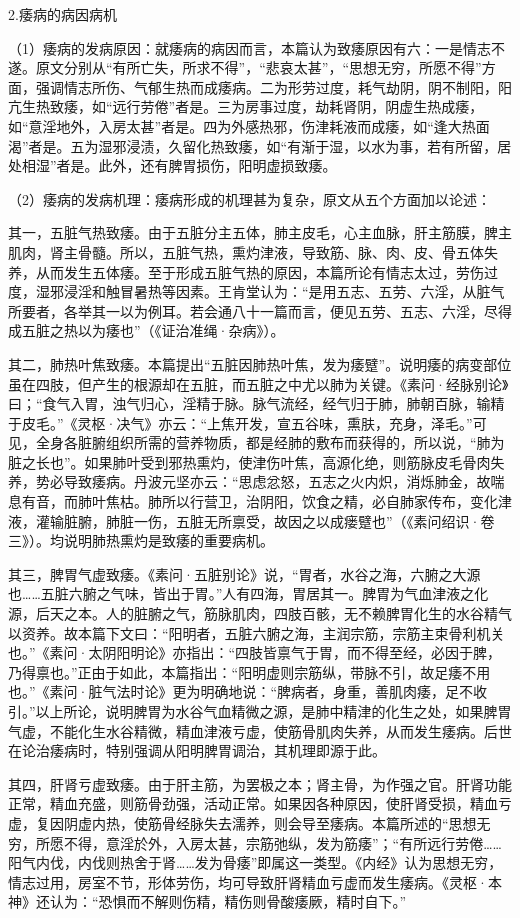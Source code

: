 \documentclass[draft,12pt]{ctexbook}
\begin{document}
2.痿病的病因病机

（1）痿病的发病原因：就痿病的病因而言，本篇认为致痿原因有六：一是情志不遂。原文分别从“有所亡失，所求不得”，“悲哀太甚”，“思想无穷，所愿不得”方面，强调情志所伤、气郁生热而成痿病。二为形劳过度，耗气劫阴，阴不制阳，阳亢生热致痿，如“远行劳倦”者是。三为房事过度，劫耗肾阴，阴虚生热成痿，如“意淫地外，入房太甚”者是。四为外感热邪，伤津耗液而成痿，如“逢大热面渴”者是。五为湿邪浸渍，久留化热致痿，如“有渐于湿，以水为事，若有所留，居处相湿”者是。此外，还有脾胃损伤，阳明虚损致痿。

（2）痿病的发病机理：痿病形成的机理甚为复杂，原文从五个方面加以论述：

其一，五脏气热致痿。由于五脏分主五体，肺主皮毛，心主血脉，肝主筋膜，脾主肌肉，肾主骨髓。所以，五脏气热，熏灼津液，导致筋、脉、肉、皮、骨五体失养，从而发生五体痿。至于形成五脏气热的原因，本篇所论有情志太过，劳伤过度，湿邪浸淫和触冒暑热等因素。王肯堂认为：“是用五志、五劳、六淫，从脏气所要者，各举其一以为例耳。若会通八十一篇而言，便见五劳、五志、六淫，尽得成五脏之热以为痿也”（《证治准绳·杂病》）。

其二，肺热叶焦致痿。本篇提出“五脏因肺热叶焦，发为痿躄”。说明痿的病变部位虽在四肢，但产生的根源却在五脏，而五脏之中尤以肺为关键。《素问·经脉别论》曰；“食气入胃，浊气归心，淫精于脉。脉气流经，经气归于肺，肺朝百脉，输精于皮毛。”《灵枢·决气》亦云：“上焦开发，宣五谷味，熏肤，充身，泽毛。”可见，全身各脏腑组织所需的营养物质，都是经肺的敷布而获得的，所以说，“肺为脏之长也”。如果肺叶受到邪热熏灼，使津伤叶焦，高源化绝，则筋脉皮毛骨肉失养，势必导致痿病。丹波元坚亦云：“思虑忿怒，五志之火内炽，消烁肺金，故喘息有音，而肺叶焦枯。肺所以行营卫，治阴阳，饮食之精，必自肺家传布，变化津液，灌输脏腑，肺脏一伤，五脏无所禀受，故因之以成瘘躄也”（《素问绍识·卷三》）。均说明肺热熏灼是致痿的重要病机。

其三，脾胃气虚致痿。《素问·五脏别论》说，“胃者，水谷之海，六腑之大源也……五脏六腑之气味，皆出于胃。”人有四海，胃居其一。脾胃为气血津液之化源，后天之本。人的脏腑之气，筋脉肌肉，四肢百骸，无不赖脾胃化生的水谷精气以资养。故本篇下文曰：“阳明者，五脏六腑之海，主润宗筋，宗筋主束骨利机关也。”《素问·太阴阳明论》亦指出：“四肢皆禀气于胃，而不得至经，必因于脾，乃得禀也。”正由于如此，本篇指出：“阳明虚则宗筋纵，带脉不引，故足痿不用也。”《素问·脏气法时论》更为明确地说：“脾病者，身重，善肌肉痿，足不收引。”以上所论，说明脾胃为水谷气血精微之源，是肺中精津的化生之处，如果脾胃气虚，不能化生水谷精微，精血津液亏虚，使筋骨肌肉失养，从而发生痿病。后世在论治痿病时，特别强调从阳明脾胃调治，其机理即源于此。

其四，肝肾亏虚致痿。由于肝主筋，为罢极之本；肾主骨，为作强之官。肝肾功能正常，精血充盛，则筋骨劲强，活动正常。如果因各种原因，使肝肾受损，精血亏虚，复因阴虚内热，使筋骨经脉失去濡养，则会导至痿病。本篇所述的“思想无穷，所愿不得，意淫於外，入房太甚，宗筋弛纵，发为筋痿”；“有所远行劳倦……阳气内伐，内伐则热舍于肾……发为骨痿”即属这一类型。《内经》认为思想无穷，情志过用，房室不节，形体劳伤，均可导致肝肾精血亏虚而发生痿病。《灵枢·本神》还认为：“恐惧而不解则伤精，精伤则骨酸痿厥，精时自下。”
\end{document}
